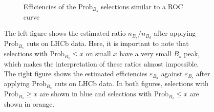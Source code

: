 \begin{figure}
\begin{subfigure}{0.5\textwidth}
        \caption{Efficiencies of the $\text{Prob}_{B_s}$ selections similar to a ROC curve}
        \label{fig:data_roc}
    \end{subfigure}%
    \caption{The left figure shows the estimated ratio $n_{B_s}/n_{B_d}$ after applying $\text{Prob}_{B_s}$ cuts on LHCb data. Here, it is important to note that selections with $\text{Prob}_{B_s} \leq x$ on small $x$ have a very small $B_s$ peak, which makes the interpretation of these ratios almost impossible. The right figure shows the estimated efficiencies $\varepsilon_{B_d}$ against $\varepsilon_{B_s}$ after applying $\text{Prob}_{B_s}$ cuts on LHCb data. In both figures, selections with $\text{Prob}_{B_s} \geq x$ are shown in blue and selections with $\text{Prob}_{B_s} \leq x$ are shown in orange.}
\end{figure}


